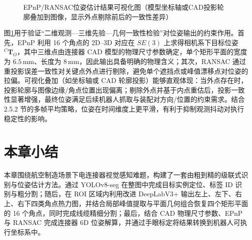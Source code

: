 \begin{figure}[htbp]
  \centering
  \caption{EPnP/RANSAC位姿估计结果可视化图（模型坐标轴或CAD投影轮廓叠加到图像，显示外点剔除前后的一致性差异）}
  \label{fig:ch2:pnp-verify}
\end{figure}

图\ref{fig:ch2:pnp-verify}用于验证“二维观测—三维先验—几何一致性检验”对位姿输出的约束作用。首先，EPnP 利用 16 个角点的 2D–3D 对应在 \(SE(3)\) 上求得相机系下目标位姿 \({}^C\mathbf{T}_O\)，其中三维点由连接器 CAD 模型的物理尺寸参数确定，单个矩形平面的宽度为 \(6.5\,\mathrm{mm}\)、长度为 \(8\,\mathrm{mm}\)，因此输出具备明确的物理含义；其次，RANSAC 通过重投影误差一致性对关键点外点进行剔除，避免单个遮挡点或峰值漂移点对位姿的拉偏。可视化叠加（如坐标轴或 CAD 轮廓投影）能够直观体现：当外点存在时，投影轮廓与图像边缘/角点位置出现偏离；剔除外点并基于内点重估后，投影一致性显著增强，最终位姿满足后续机器人抓取与装配对方向/位置的约束需求。结合 2.5.2 节的多帧平均策略，位姿在时间维度上更平滑，有利于抑制观测抖动对执行稳定性的影响。

\section{本章小结}
本章围绕航空制造场景下电连接器视觉感知难题，构建了一套由粗到精的级联式识别与位姿估计方法。通过 YOLOv8-seg 在整图中完成目标实例定位、标签 ID 识别与粗分割；随后，在 ROI 区域内利用改进 DeepLabV3+ 输出左上、左下、右上、右下四类角点热力图，并结合局部峰值提取与平面几何组合恢复四个矩形平面的 16 个角点，同时完成线缆精细分割；最后，结合 CAD 物理尺寸参数、EPnP 与 RANSAC 完成连接器 6D 位姿解算，并通过手眼标定将结果转换到机器人可执行坐标系中。